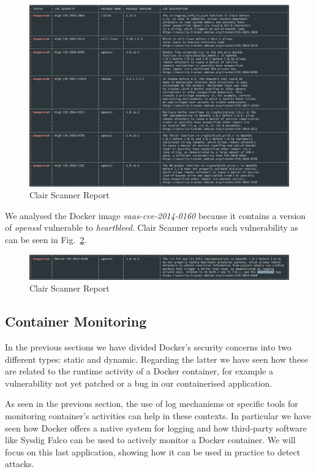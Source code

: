 \documentclass[a4paper,12pt]{article}
\def\myfig#1{Fig.~#1\xspace}
\begin{document}
\begin{figure}[ht!]
  \centerline{\includegraphics[width=1\textwidth]{clair_report.png}}
  \caption{Clair Scanner Report}
  \label{fig:clair_report}
  \end{figure}

We analysed the Docker image \textit{vaas-cve-2014-0160} because it contains a
version of \textit{openssl} vulnerable to \textit{heartbleed}. Clair Scanner
reports such vulnerability as can be seen in \myfig{\ref{fig:clair_heartbleed}}.

  \begin{figure}[ht!]
    \centerline{\includegraphics[width=1\textwidth]{clair_heartbleed.png}}
    \caption{Clair Scanner Report}
    \label{fig:clair_heartbleed}
    \end{figure}

\subsection{Container Monitoring}

In the previous sections we have divided Docker's security concerns into two
different types: static and dynamic. Regarding the latter we have seen how these
are related to the runtime activity of a Docker container, for example a
vulnerability not yet patched or a bug in our containerised application. \par As
seen in the previous section, the use of log mechanisms or specific tools for
monitoring container's activities can help in these contexts. In particular we
have seen how Docker offers a native system for logging and how third-party
software like Sysdig Falco can be used to actively monitor a Docker container.
We will focus on this last application, showing how it can be used in practice
to detect attacks. 
\end{document}
